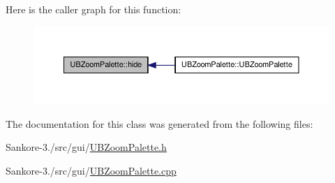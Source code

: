 Here is the caller graph for this function\-:
\nopagebreak
\begin{figure}[H]
\begin{center}
\leavevmode
\includegraphics[width=350pt]{db/dbc/class_u_b_zoom_palette_afc19e4c405b1ee8586431342ddce5112_icgraph}
\end{center}
\end{figure}




The documentation for this class was generated from the following files\-:\begin{DoxyCompactItemize}
\item 
Sankore-\/3./src/gui/\hyperlink{_u_b_zoom_palette_8h}{U\-B\-Zoom\-Palette.\-h}\item 
Sankore-\/3./src/gui/\hyperlink{_u_b_zoom_palette_8cpp}{U\-B\-Zoom\-Palette.\-cpp}\end{DoxyCompactItemize}
